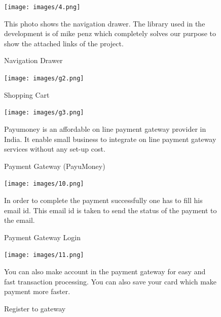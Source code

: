 \newpage

\begin{figure}[ht]
\centering
\texttt{[image: images/4.png]}
\caption{Navigation Drawer}

This photo shows the navigation drawer. The library used in the development is of mike penz which completely solves our purpose to show the attached links of the project.

\end{figure}

\newpage

\begin{figure}[ht]
\centering
\texttt{[image: images/g2.png]}
\caption{Shopping Cart}
\end{figure}

\newpage

\begin{figure}[ht]
\centering
\texttt{[image: images/g3.png]}
\caption{Payment Gateway (PayuMoney)}

Payumoney is an affordable on line payment gateway provider in India. It enable small business to integrate on line payment gateway services without any set-up cost.

\end{figure}



\newpage

\begin{figure}[ht]
\centering
\texttt{[image: images/10.png]}
\caption{Payment Gateway Login}

In order to complete the payment successfully one has to fill his email id. This email id is taken to send the status of the payment to the email.
\end{figure}

\newpage

\begin{figure}[ht]
\centering
\texttt{[image: images/11.png]}
\caption{Register to gateway}

You can also make account in the payment gateway for easy and fast transaction processing. You can also save your card which make payment more faster.
\end{figure}

\newpage

